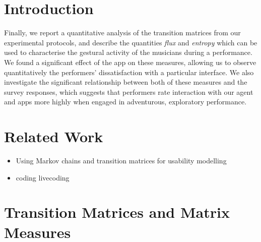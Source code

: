\documentclass{sigchi}
\begin{document}

\section{Introduction}



Finally, we report a quantitative analysis of the transition matrices
from our experimental protocols, and describe the quantities
\emph{flux} and \emph{entropy} which can be used to characterise the
gestural activity of the musicians during a performance. We found a
significant effect of the app on these measures, allowing us to
observe quantitatively the performers' dissatisfaction with a
particular interface. We also investigate the significant relationship
between both of these measures and the survey responses, which
suggests that performers rate interaction with our agent and apps more
highly when engaged in adventurous, exploratory performance.

\section{Related Work}

\begin{itemize}
\item Using Markov chains and transition matrices for usability
  modelling~\cite{Thimbleby:2001kq,Thimbleby:2004fj}
\item coding livecoding~\cite{Swift:2014tya}
\end{itemize}

\section{Transition Matrices and Matrix Measures}
\end{document}
